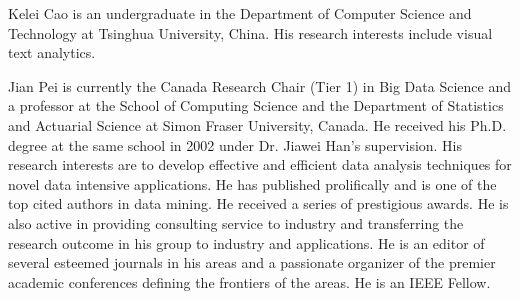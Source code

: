 \documentclass[10pt,journal,cspaper,compsoc]{IEEEtran}
\begin{document}
\vspace{-8mm}
\begin{IEEEbiography}{Kelei Cao}
is an undergraduate in the Department of Computer Science and Technology at Tsinghua University, China. His research interests include visual text analytics.

%
\vspace{-8mm}
\end{IEEEbiography}

\vspace{-8mm}

\begin{IEEEbiography}{Jian Pei}
is currently the Canada Research Chair (Tier 1) in Big Data Science and a professor at the School of Computing Science and the Department of Statistics and Actuarial Science at Simon Fraser University, Canada. He received his Ph.D. degree at the same school in 2002 under Dr. Jiawei Han's supervision.  His research interests are to develop effective and efficient data analysis techniques for novel data intensive applications.  He has published prolifically and is one of the top cited authors in data mining.  He received a series of prestigious awards.  He is also active in providing consulting service to industry and transferring the research outcome in his group to industry and applications.  He is an editor of several esteemed journals in his areas and a passionate organizer of the premier academic conferences defining the frontiers of the areas. He is an IEEE Fellow.
%
\end{IEEEbiography}
\end{document}
